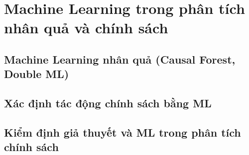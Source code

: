 \chapter{Machine Learning trong phân tích nhân quả và chính sách}
\section{Machine Learning nhân quả (Causal Forest, Double ML)}
\section{Xác định tác động chính sách bằng ML}
\section{Kiểm định giả thuyết và ML trong phân tích chính sách}